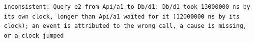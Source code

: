 \begin{lstlisting}[language={},basicstyle=\ttfamily\scriptsize,breaklines=true]
inconsistent: Query e2 from Api/a1 to Db/d1: Db/d1 took 13000000 ns by its own clock, longer than Api/a1 waited for it (12000000 ns by its clock); an event is attributed to the wrong call, a cause is missing, or a clock jumped
\end{lstlisting}
